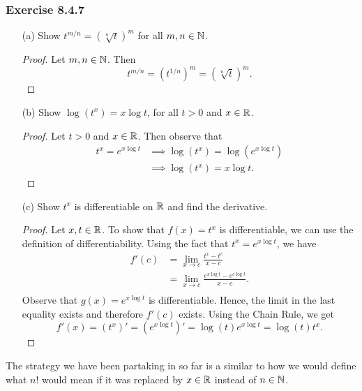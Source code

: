 \subsubsection{Exercise 8.4.7}  
\begin{enumerate}
    \item[(a)] Show \( t^{m/n} = (\sqrt[n]{t})^{m}  \) for all \( m,n \in \mathbb{N}  \).
        \begin{proof}
        Let \( m, n \in \mathbb{N}  \). Then 
        \[  t^{m/n} = (t^{1/n})^{m} = (\sqrt[n]{t})^{m}. \]
        \end{proof}
    \item[(b)] Show \( \log(t^{x}) = x \log t \), for all \( t > 0  \) and \( x \in \mathbb{R} \).
        \begin{proof}
        Let \( t > 0  \) and \( x \in \mathbb{R}  \). Then observe that 
        \begin{align*}  
            t^{x} = e^{x \log t } &\implies \log(t^{x}) = \log(e^{x\log t }) \\ 
                                  &\implies \log (t^{x} ) = x \log t.
        \end{align*}
        \end{proof}
    \item[(c)] Show \( t^{x} \) is differentiable on \( \mathbb{R}  \) and find the derivative.
        \begin{proof}
        Let \( x,t \in \mathbb{R}  \). To show that \( f(x) = t^{x}  \) is differentiable, we can use the definition of differentiability. Using the fact that \( t^{x} = e^{x \log t }  \), we have    
        \begin{align*}
            f'(c) &= \lim_{ x \to c } \frac{ t^{x} - t^{c} }{  x -c  }  \\
                  &= \lim_{ x \to c }  \frac{ e^{x \log t } - e^{c \log t }  }{ x -c  }.  \\
        \end{align*}
        Observe that \( g(x) = e^{x \log t}  \) is differentiable. Hence, the limit in the last equality exists and therefore \( f'(c)  \) exists. Using the Chain Rule, we get
        \[  f'(x) = (t^{x} )' = (e^{x \log t })' = \log(t) e^{x \log t } = \log (t) t^{x}.\]
        \end{proof} 
\end{enumerate}

The strategy we have been partaking in so far is a similar to how we would define what \( n!  \) would mean if it was replaced by \( x  \in \mathbb{R}  \) instead of \( n \in \mathbb{N}  \). 

